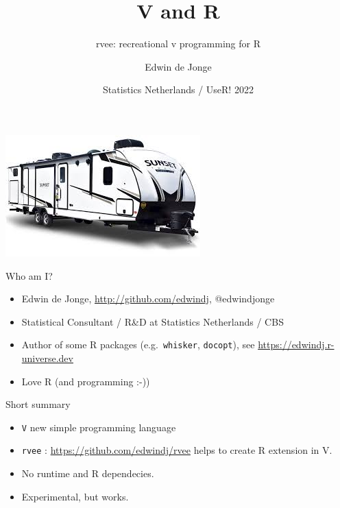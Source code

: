 \documentclass[
  ignorenonframetext,
]{beamer}
\title{V and R}
\subtitle{rvee: recreational v programming for R}
\author{Edwin de Jonge}
\date{Statistics Netherlands / UseR! 2022}
\providecommand{\tightlist}{%
  \setlength{\itemsep}{0pt}\setlength{\parskip}{0pt}}
\begin{document}
\frame{\titlepage}

\begin{frame}{}
\protect\hypertarget{section}{}
\begin{centering}
  \includegraphics[width=0.8\paperwidth]{img/rv}
  \par
\end{centering}
\end{frame}

\begin{frame}[fragile]{Who am I?}
\protect\hypertarget{who-am-i}{}
\begin{itemize}
\tightlist
\item
  Edwin de Jonge, \url{http://github.com/edwindj}, @edwindjonge
\item
  Statistical Consultant / R\&D at Statistics Netherlands / CBS
\item
  Author of some R packages (e.g.~\texttt{whisker}, \texttt{docopt}),
  see \url{https://edwindj.r-universe.dev}
\item
  Love R (and programming :-))
\end{itemize}
\end{frame}

\begin{frame}[fragile]{Short summary}
\protect\hypertarget{short-summary}{}
\begin{itemize}
\tightlist
\item
  \texttt{V} new simple programming language
\item
  \texttt{rvee} : \url{https://github.com/edwindj/rvee} helps to create
  R extension in V.
\item
  No runtime and R dependecies.
\item
  Experimental, but works.
\end{itemize}
\end{frame}
\end{document}
